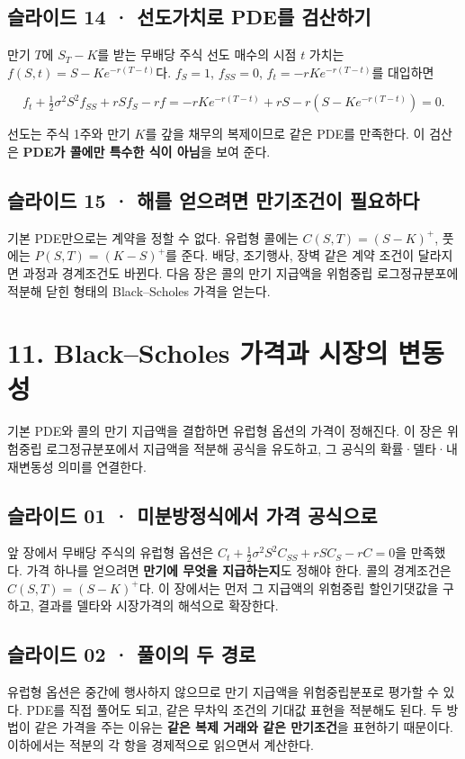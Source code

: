 \documentclass[11pt,a4paper]{article}
\begin{document}
\subsection{슬라이드 14 · 선도가치로 PDE를 검산하기}
만기 $T$에 $S_T-K$를 받는 무배당 주식 선도 매수의 시점 $t$ 가치는 $f(S,t)=S-Ke^{-r(T-t)}$다. $f_S=1$, $f_{SS}=0$, $f_t=-rKe^{-r(T-t)}$를 대입하면\par

\[
f_t+\tfrac12\sigma^2S^2f_{SS}+rSf_S-rf
=-rKe^{-r(T-t)}+rS-r(S-Ke^{-r(T-t)})=0.
\]

선도는 주식 1주와 만기 $K$를 갚을 채무의 복제이므로 같은 PDE를 만족한다. 이 검산은 \textbf{PDE가 콜에만 특수한 식이 아님}을 보여 준다.\par

\subsection{슬라이드 15 · 해를 얻으려면 만기조건이 필요하다}
기본 PDE만으로는 계약을 정할 수 없다. 유럽형 콜에는 $C(S,T)=(S-K)^+$, 풋에는 $P(S,T)=(K-S)^+$를 준다. 배당, 조기행사, 장벽 같은 계약 조건이 달라지면 과정과 경계조건도 바뀐다. 다음 장은 콜의 만기 지급액을 위험중립 로그정규분포에 적분해 닫힌 형태의 Black–Scholes 가격을 얻는다.\par

\section{11. Black–Scholes 가격과 시장의 변동성}
기본 PDE와 콜의 만기 지급액을 결합하면 유럽형 옵션의 가격이 정해진다. 이 장은 위험중립 로그정규분포에서 지급액을 적분해 공식을 유도하고, 그 공식의 확률·델타·내재변동성 의미를 연결한다.\par

\subsection{슬라이드 01 · 미분방정식에서 가격 공식으로}
앞 장에서 무배당 주식의 유럽형 옵션은 $C_t+\frac12\sigma^2S^2C_{SS}+rSC_S-rC=0$을 만족했다. 가격 하나를 얻으려면 \textbf{만기에 무엇을 지급하는지}도 정해야 한다. 콜의 경계조건은 $C(S,T)=(S-K)^+$다. 이 장에서는 먼저 그 지급액의 위험중립 할인기댓값을 구하고, 결과를 델타와 시장가격의 해석으로 확장한다.\par

\subsection{슬라이드 02 · 풀이의 두 경로}
유럽형 옵션은 중간에 행사하지 않으므로 만기 지급액을 위험중립분포로 평가할 수 있다. PDE를 직접 풀어도 되고, 같은 무차익 조건의 기대값 표현을 적분해도 된다. 두 방법이 같은 가격을 주는 이유는 \textbf{같은 복제 거래와 같은 만기조건}을 표현하기 때문이다. 이하에서는 적분의 각 항을 경제적으로 읽으면서 계산한다.\par
\end{document}
